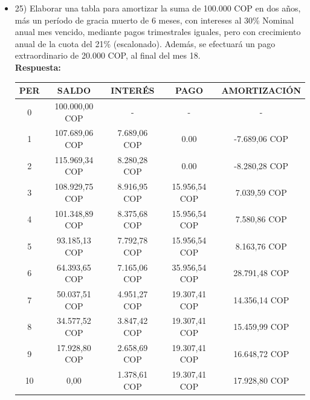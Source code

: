 \begin{itemize}
 \item 25)	 Elaborar una tabla para amortizar la suma de 100.000 COP en dos años, más un período de gracia muerto de 6 meses, con intereses al 30\% Nominal anual mes vencido, mediante pagos trimestrales iguales, pero con crecimiento anual de la cuota del 21\% (escalonado). Además, se efectuará un pago extraordinario de 20.000 COP, al final del mes 18.\\
 \textbf{Respuesta:}\\
       \begin{center}
        \begin{tabular}{| c | c | c | c | c |}\hline
           \textbf{PER} & \textbf{SALDO} & \textbf{INTERÉS} & \textbf{PAGO} & \textbf{AMORTIZACIÓN}  \\ \hline
        0 & 100.000,00 COP & - & - & -  \\ \hline
        1 & 107.689,06 COP & 7.689,06 COP &  0.00 & -7.689,06 COP \\ \hline
        2 & 115.969,34 COP & 8.280,28 COP & 0.00 & -8.280,28 COP \\ \hline
        3 & 108.929,75 COP & 8.916,95 COP & 15.956,54 COP & 7.039,59 COP \\ \hline
        4 & 101.348,89 COP & 8.375,68 COP & 15.956,54 COP & 7.580,86 COP \\ \hline
        5 & 93.185,13 COP & 7.792,78 COP & 15.956,54 COP & 8.163,76 COP \\ \hline
        6 & 64.393,65 COP & 7.165,06 COP & 35.956,54 COP & 28.791,48 COP \\ \hline
        7 & 50.037,51 COP & 4.951,27 COP & 19.307,41 COP & 14.356,14 COP \\ \hline
        8 & 34.577,52 COP & 3.847,42 COP & 19.307,41 COP & 15.459,99 COP \\ \hline
        9 & 17.928,80 COP & 2.658,69 COP & 19.307,41 COP & 16.648,72 COP \\ \hline
        10 & 0,00 & 1.378,61 COP & 19.307,41 COP & 17.928,80 COP \\ \hline
        \end{tabular}\\
        \end{center}


\end{itemize}
